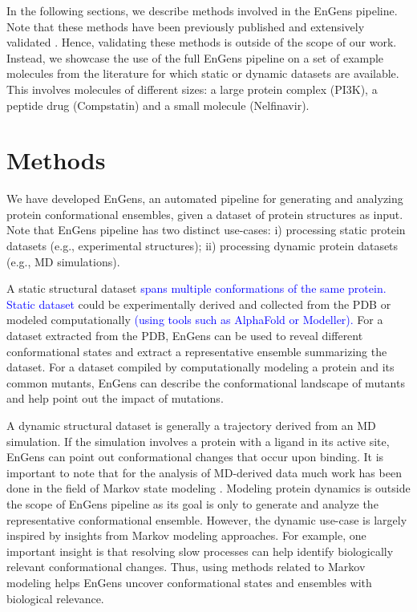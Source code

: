 \documentclass[unnumsec,webpdf,contemporary,large,numsquare]{oup-authoring-template}%
\theoremstyle{thmstyleone}%
\theoremstyle{thmstyletwo}%
\theoremstyle{thmstylethree}%
\begin{document}
In the following sections, we describe methods involved in the EnGens pipeline. Note that these methods have been previously published and extensively validated \citep{scherer_pyemma_2015, chen_nonlinear_2019, trozzi_umap_2021, perez-hernandez_identification_2013, schwantes_modeling_2015}. Hence, validating these methods is outside of the scope of our work. Instead, we showcase the use of the full EnGens pipeline on a set of example molecules from the literature for which static or dynamic datasets are available. This involves molecules of different sizes: a large protein complex (PI3K), a peptide drug (Compstatin) and a small molecule (Nelfinavir). 

\section{Methods}\label{sec2}

We have developed EnGens, an automated pipeline for generating and analyzing protein conformational ensembles, given a dataset of protein structures as input. Note that EnGens pipeline has two distinct use-cases: i) processing static protein datasets (e.g., experimental structures); ii) processing  dynamic protein datasets (e.g., MD simulations). 

A static structural dataset \textcolor{blue}{spans multiple conformations of the same protein. Static dataset} could be experimentally derived and collected from the PDB or modeled computationally \textcolor{blue}{(using tools such as AlphaFold or Modeller).} For a dataset extracted from the PDB, EnGens can be used to reveal different conformational states and extract a representative ensemble summarizing the dataset. For a dataset compiled by computationally modeling a protein and its common mutants, EnGens can describe the conformational landscape of mutants and help point out the impact of mutations.

A dynamic structural dataset is generally a trajectory derived from an MD simulation. If the simulation involves a protein with a ligand in its active site, EnGens can point out conformational changes that occur upon binding. It is important to note that for the analysis of MD-derived data much work has been done in the field of Markov state modeling \citep{abella_markov_2020, husic_markov_2018, bernetti_integrated_2019}. Modeling protein dynamics is outside the scope of EnGens pipeline as its goal is only to generate and analyze the representative conformational ensemble. However, the dynamic use-case is largely inspired by insights from Markov modeling approaches. For example, one important insight is that resolving slow processes can help identify biologically relevant conformational changes. Thus, using methods related to Markov modeling helps EnGens uncover conformational states and ensembles with biological relevance. 
\end{document}
